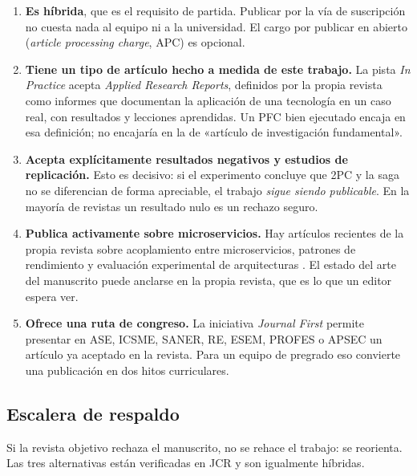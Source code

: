 \documentclass[11pt,a4paper]{article}
\begin{document}
\begin{enumerate}[leftmargin=*,itemsep=5pt]
	\item \textbf{Es híbrida}, que es el requisito de partida. Publicar por la vía de suscripción no cuesta nada al equipo ni a la universidad. El cargo por publicar en abierto (\emph{article processing charge}, APC) es opcional.
	\item \textbf{Tiene un tipo de artículo hecho a medida de este trabajo.} La pista \emph{In Practice} acepta \emph{Applied Research Reports}, definidos por la propia revista como informes que documentan la aplicación de una tecnología en un caso real, con resultados y lecciones aprendidas. Un PFC bien ejecutado encaja en esa definición; no encajaría en la de «artículo de investigación fundamental».
	\item \textbf{Acepta explícitamente resultados negativos y estudios de replicación.} Esto es decisivo: si el experimento concluye que 2PC y la saga no se diferencian de forma apreciable, el trabajo \emph{sigue siendo publicable}. En la mayoría de revistas un resultado nulo es un rechazo seguro.
	\item \textbf{Publica activamente sobre microservicios.} Hay artículos recientes de la propia revista sobre acoplamiento entre microservicios, patrones de rendimiento y evaluación experimental de arquitecturas \cite{zhong2023measuring,meijer2024experimental,henning2024benchmarking}. El estado del arte del manuscrito puede anclarse en la propia revista, que es lo que un editor espera ver.
	\item \textbf{Ofrece una ruta de congreso.} La iniciativa \emph{Journal First} permite presentar en ASE, ICSME, SANER, RE, ESEM, PROFES o APSEC un artículo ya aceptado en la revista. Para un equipo de pregrado eso convierte una publicación en dos hitos curriculares.
\end{enumerate}

\subsection{Escalera de respaldo}

Si la revista objetivo rechaza el manuscrito, no se rehace el trabajo: se reorienta. Las tres alternativas están verificadas en JCR y son igualmente híbridas.
\end{document}
